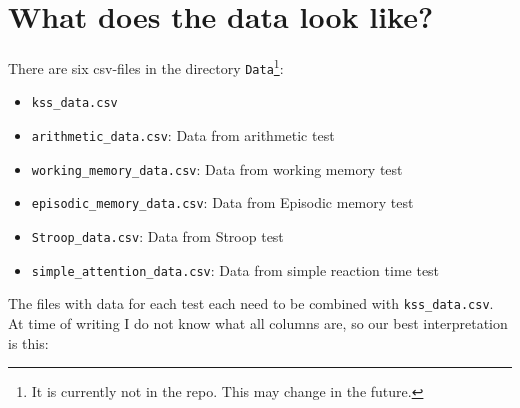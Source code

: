 \documentclass[10pt, twoside,a4paper]{article}
\begin{document}
\section{What does the data look like?}
There are six csv-files in the directory \verb+Data+\footnote{It is currently not in the repo. This may change in the future.}:
\begin{itemize}
\item \verb+kss_data.csv+
\item \verb+arithmetic_data.csv+: Data from arithmetic test
\item \verb+working_memory_data.csv+: Data from working memory test
\item \verb+episodic_memory_data.csv+: Data from Episodic memory test
\item \verb+Stroop_data.csv+: Data from Stroop test
\item \verb+simple_attention_data.csv+: Data from simple reaction time test
\end{itemize}
The files with data for each test each need to be combined with \verb+kss_data.csv+. At time of writing I do not know what all columns are, so our best interpretation is this:
\end{document}
